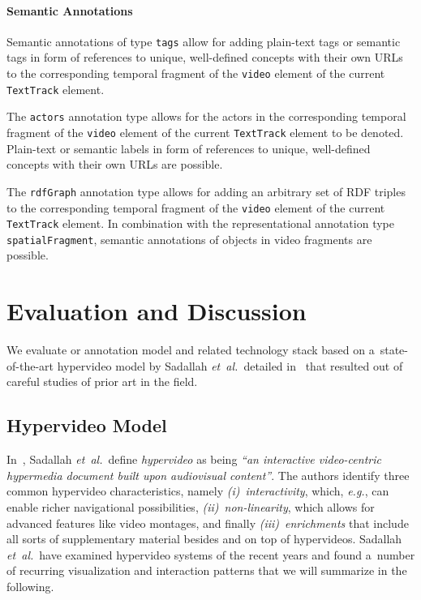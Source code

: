 \documentclass{sig-alternate}
\begin{document}
\paragraph{Semantic Annotations}

\begin{description}[leftmargin=*]
  \item[Tags:] Semantic annotations of type \texttt{tags}
    allow for adding plain-text tags or semantic tags 
    in form of references to unique, well-defined concepts
    with their own URLs to the corresponding
    temporal fragment of the
    \texttt{video} element of the current
    \texttt{TextTrack} element.
  \item[Actors:] The \texttt{actors} annotation type allows for
    the actors in the corresponding temporal
    fragment of the \texttt{video} element of the current
    \texttt{TextTrack} element to be denoted.
    Plain-text or semantic labels 
    in form of references to unique, well-defined concepts
    with their own URLs are possible.
  \item[RDF Graph:] The \texttt{rdfGraph} annotation type
    allows for adding an arbitrary set of RDF triples
    to the corresponding temporal fragment of the
    \texttt{video} element of the current
    \texttt{TextTrack} element. In combination with the
    representational annotation type \texttt{spatialFragment},
    semantic annotations of objects
    in video fragments are possible.
\end{description}
  
\section{Evaluation and Discussion}

We evaluate or annotation model and related technology stack
based on a~state-of-the-art hypervideo model by
Sadallah \emph{et~al.}\ detailed in~\cite{sadallah2012hypervideo}
that resulted out of careful studies of prior art in the field.

\subsection{Hypervideo Model}

In~\cite{sadallah2012hypervideo}, Sadallah \emph{et~al.}\ define
\emph{hypervideo} as being \textit{``an interactive video-centric
hypermedia document built upon audiovisual content''}.
The authors identify three common hypervideo characteristics,
namely \emph{(i)}~\emph{interactivity}, which, \emph{e.g.},
can enable richer navigational possibilities, 
\emph{(ii)}~\emph{non-linearity}, which allows for advanced features
like video montages, and finally \emph{(iii)}~\emph{enrichments}
that include all sorts of supplementary material besides
and on top of hypervideos.
Sadallah \emph{et~al.}\ have examined hypervideo systems
of the recent years and found a~number of
recurring visualization and interaction patterns
that we will summarize in the following.
\end{document}

